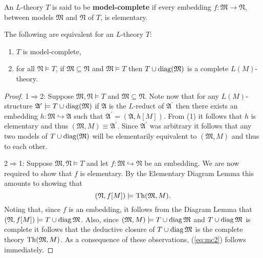 \begin{dfn}
	An $L$-theory $T$ is said to be \textbf{model-complete} if every embedding $f\colon\mathfrak{M}\to\mathfrak{N}$, between models $\mathfrak{M}$ and $\mathfrak{N}$ of $T$, is elementary.
\end{dfn}

\begin{prp}
	The following are equivalent for an $L$-theory $T$:
	\begin{enumerate}
		\item	$T$ is model-complete,
		\item	for all $\mathfrak{N}\models T$, if $\mathfrak{M}\subseteq\mathfrak{N}$ and $\mathfrak{M}\models T$ then $T\cup\operatorname{diag}(\mathfrak{M})$ is a complete $L(M)$-theory.
	\end{enumerate}
\end{prp}
\begin{proof}
	1$\Rightarrow$2: Suppose $\mathfrak{M},\mathfrak{N}\models T$ and $\mathfrak{M}\subseteq\mathfrak{N}$.  Note now that for any $L(M)$-structure $\mathfrak{A}^\prime\models T\cup\operatorname{diag}(\mathfrak{M})$ if $\mathfrak{A}$ is the $L$-reduct of $\mathfrak{A}^\prime$ then there exists an embedding $h\colon\mathfrak{M}\hookrightarrow\mathfrak{A}$ such that $\mathfrak{A}^\prime=(\mathfrak{A},h[M])$.  From (1) it follows that $h$ is elementary and thus $(\mathfrak{M},M)\equiv\mathfrak{A}^\prime$.  Since $\mathfrak{A}^\prime$ was arbitrary it follows that any two models of $T\cup\operatorname{diag}(\mathfrak{M})$ will be elementarily equivalent to $(\mathfrak{M},M)$ and thus to each other.

	2$\Rightarrow$1:  Suppose $\mathfrak{M},\mathfrak{N}\models T$ and let $f\colon\mathfrak{M}\hookrightarrow\mathfrak{N}$ be an embedding.  We are now required to show that $f$ is elementary.  By the Elementary Diagram Lemma this amounts to showing that
	\begin{equation}\label{eq:mc2}
		(\mathfrak{N},f[M])\models\operatorname{Th}(\mathfrak{M},M).
	\end{equation}
	Noting that, since $f$ is an embedding, it follows from the Diagram Lemma that $(\mathfrak{N},f[M])\models T\cup\operatorname{diag}{\mathfrak{M}}$.  Also, since $(\mathfrak{M},M)\models T\cup\operatorname{diag}{\mathfrak{M}}$ and $T\cup\operatorname{diag}{\mathfrak{M}}$ is complete it follows that the deductive closure of $T\cup\operatorname{diag}{\mathfrak{M}}$ is the complete theory $\operatorname{Th}(\mathfrak{M},M)$.  As a consequence of these observations, (\ref{eq:mc2}) follows immediately.
\end{proof}

